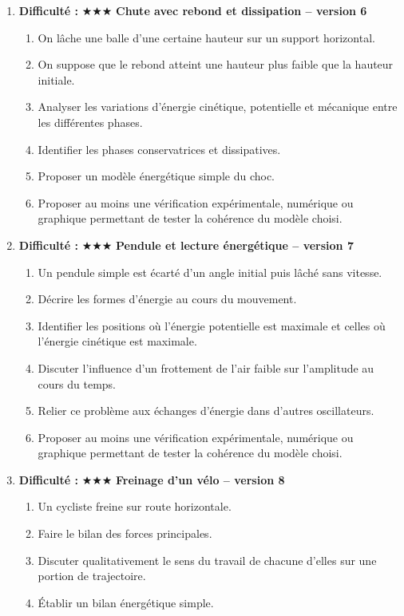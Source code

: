 \documentclass[11pt,a4paper]{article}
\newcommand{\etoiles}[1]{\textbf{Difficulté : }#1}
\begin{document}
\begin{enumerate}[label=\textbf{Problème long \arabic*.},leftmargin=*]
\begin{enumerate}[label=\alph*)]
\end{enumerate}
\item \etoiles{★★★}
\textbf{Chute avec rebond et dissipation -- version 6}
\begin{enumerate}[label=\alph*)]
\item On lâche une balle d'une certaine hauteur sur un support horizontal.
\item On suppose que le rebond atteint une hauteur plus faible que la hauteur initiale.
\item Analyser les variations d'énergie cinétique, potentielle et mécanique entre les différentes phases.
\item Identifier les phases conservatrices et dissipatives.
\item Proposer un modèle énergétique simple du choc.
\item Proposer au moins une vérification expérimentale, numérique ou graphique permettant de tester la cohérence du modèle choisi.
\end{enumerate}
\item \etoiles{★★★}
\textbf{Pendule et lecture énergétique -- version 7}
\begin{enumerate}[label=\alph*)]
\item Un pendule simple est écarté d'un angle initial puis lâché sans vitesse.
\item Décrire les formes d'énergie au cours du mouvement.
\item Identifier les positions où l'énergie potentielle est maximale et celles où l'énergie cinétique est maximale.
\item Discuter l'influence d'un frottement de l'air faible sur l'amplitude au cours du temps.
\item Relier ce problème aux échanges d'énergie dans d'autres oscillateurs.
\item Proposer au moins une vérification expérimentale, numérique ou graphique permettant de tester la cohérence du modèle choisi.
\end{enumerate}
\item \etoiles{★★★}
\textbf{Freinage d'un vélo -- version 8}
\begin{enumerate}[label=\alph*)]
\item Un cycliste freine sur route horizontale.
\item Faire le bilan des forces principales.
\item Discuter qualitativement le sens du travail de chacune d'elles sur une portion de trajectoire.
\item Établir un bilan énergétique simple.

\end{enumerate}
\end{enumerate}
\end{document}
